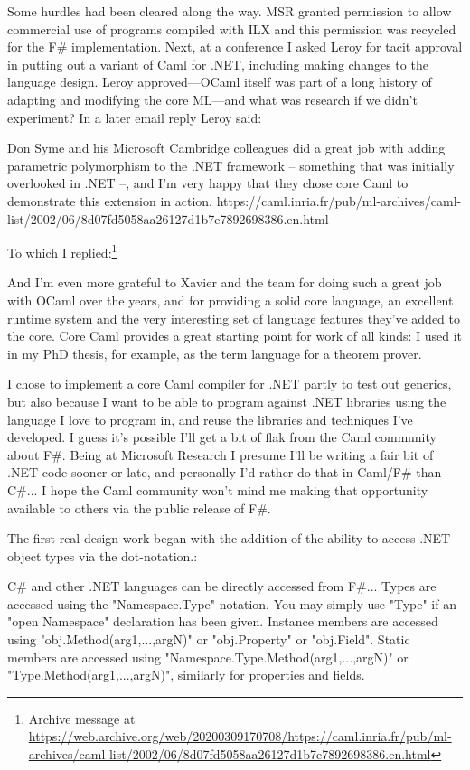 \documentclass[acmsmall]{acmart}\settopmatter{}
\begin{document}
Some hurdles had been cleared along the way. MSR granted permission to allow commercial use of programs compiled with ILX and this permission was recycled for the F\# implementation. Next, at a conference I asked Leroy for tacit approval in putting out a variant of Caml for .NET, including making changes to the language design.  Leroy approved---OCaml itself was part of a long history of adapting and modifying the core ML---and what was research if we didn’t experiment?  In a later email reply Leroy said:

\begin{verbquote}
Don Syme and his Microsoft Cambridge colleagues did a great job with adding parametric polymorphism to the .NET framework -- something that was initially overlooked in .NET --, and I'm very happy that they chose core Caml to demonstrate this extension in action. https://caml.inria.fr/pub/ml-archives/caml-list/2002/06/8d07fd5058aa26127d1b7e7892698386.en.html 
\end{verbquote}
To which I replied:\footnote{Archive message at \url{https://web.archive.org/web/20200309170708/https://caml.inria.fr/pub/ml-archives/caml-list/2002/06/8d07fd5058aa26127d1b7e7892698386.en.html}}
\begin{verbquote}
And I'm even more grateful to Xavier and the team for doing such a great job with OCaml over the years, and for providing a solid core language, an excellent runtime system and the very interesting set of language features they've added to the core.  Core Caml provides a great starting point for work of all kinds: I used it in my PhD thesis, for example, as the term language for a theorem prover.

I chose to implement a core Caml compiler for .NET partly to test out generics, but also because I want to be able to program against .NET libraries using the language I love to program in, and reuse the libraries and techniques I've developed.  I guess it's possible I'll get a bit of flak from the Caml community about F#.  Being at Microsoft Research I presume I'll be writing a fair bit of .NET code sooner or late, and personally I'd rather do that in Caml/F# than C#... I hope the Caml community won't mind me making that opportunity available to others via the public release of F#.  
\end{verbquote}
The first real design-work began with the addition of the ability to access .NET object types via the dot-notation.:
\begin{verbquote}
C# and other .NET languages can be directly accessed from F#...  Types are accessed using the "Namespace.Type" notation.  You may simply use "Type" if an "open Namespace" declaration has been given. Instance members are accessed using "obj.Method(arg1,...,argN)" or "obj.Property" or "obj.Field". Static members are accessed using "Namespace.Type.Method(arg1,...,argN)" or "Type.Method(arg1,...,argN)", similarly for properties and fields. 
\end{verbquote}
\end{document}
